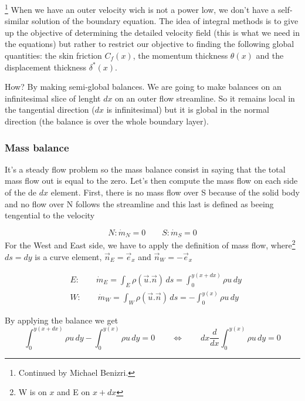 \footnote{Continued by Michael Benizri.} When we have an outer velocity wich is not a power low, we don't have a self-similar solution of the boundary equation. The idea of integral methods is to give up the objective of determining the detailed velocity field (this is what we need in the equations) but rather to restrict our objective to finding the following global quantities: the skin friction $C_f(x)$, the momentum thickness $\theta (x)$ and the displacement thickness $\delta ^*(x)$.

How? By making semi-global balances. We are going to make balances on an infinitesimal slice of lenght $dx$ on an outer flow streamline. So it remains local in the tangential direction ($dx$ is infinitesimal) but it is global in the normal direction (the balance is over the whole boundary layer).

\subsubsection{Mass balance} 
It's a steady flow problem so the mass balance consist in saying that the total mass flow out is equal to the zero. Let's then compute the mass flow on each side of the de $dx$ element. First, there is no mass flow over S because of the solid body and no flow over N follows the streamline and this last is defined as beeing tengential to the velocity 

\begin{equation}
	N : \dot{m}_N=0 \qquad S : \dot{m}_S=0
\end{equation}
For the West and East side, we have to apply the definition of mass flow, where\footnote{W is on $x$ and E on $x+dx$} $ds = dy$ is a curve element, $\vec{n}_E=\vec{e}_x$ and $\vec{n}_W=-\vec{e}_x$

\begin{equation}
\begin{aligned}
&E: 	\qquad\dot{m}_E= \int_{E} \rho (\vec{u}.\vec{n})\,  d s  
		= \int_{0}^{y(x+dx)} \rho u \, d y \\ 
&W: \qquad\dot{m}_W= \int_{W} \rho (\vec{u}.\vec{n})\, d s  
		 = -\int_{0}^{y(x)} \rho u \,d y  
		\end{aligned}
\end{equation}

By applying the balance we get
\begin{equation}
\int_{0}^{y(x+dx)} \rho u \, d y - \int_{0}^{y(x)} \rho u \, d y =0\qquad \Leftrightarrow \qquad dx \frac{d}{dx} \int_{0}^{y(x)} \rho u \, d y =0 
\end{equation}

